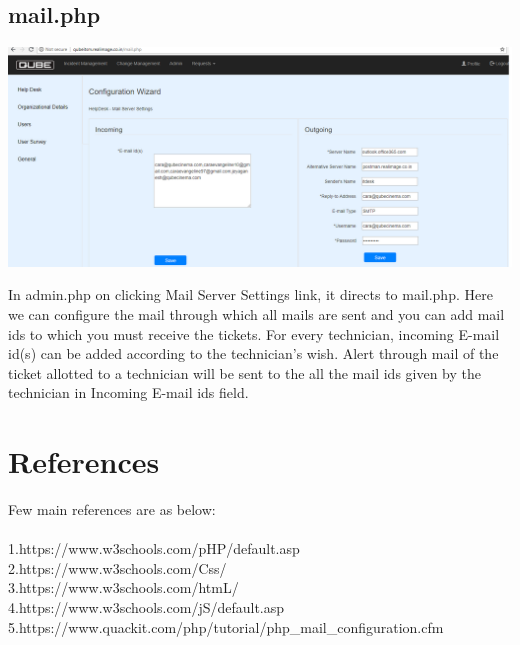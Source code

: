 \documentclass{article}
\begin{document}
 \subsection{mail.php}
\begin{center}

    \includegraphics[width=7.0in]{mail1.png}
   
    \label{}

\end{center}
In admin.php on clicking Mail Server Settings link, it directs to mail.php. Here we can configure the mail through which all mails are sent and you can add mail ids to which you must receive the tickets. For every technician, incoming E-mail id\big(s\big) can be added according to the technician's wish. Alert through mail of the ticket allotted to a technician will be sent to the all the mail ids given by the technician in Incoming E-mail ids field. 
\section{References}
Few main references are as below:\\\\
1.https://www.w3schools.com/pHP/default.asp\\
2.https://www.w3schools.com/Css/\\
3.https://www.w3schools.com/htmL/\\
4.https://www.w3schools.com/jS/default.asp\\
5.https://www.quackit.com/php/tutorial/php\_mail\_configuration.cfm
\end{document}
